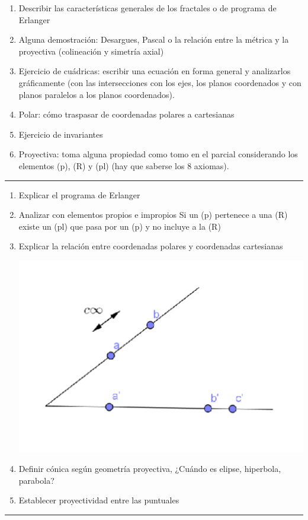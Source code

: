 \documentclass[9pt,a4paper]{extarticle}
\begin{document}
\begin{enumerate}
    \item Describir las características generales de los fractales o de programa de Erlanger
\item	Alguna demostración: Desargues, Pascal o la relación entre la métrica y la proyectiva (colineación y simetría axial)
\item	Ejercicio de cuádricas: escribir una ecuación en forma general y analizarlos gráficamente (con las intersecciones con los ejes, los planos coordenados y con planos paralelos a los planos coordenados).
\item	Polar: cómo traspasar de coordenadas polares a cartesianas
\item	Ejercicio de invariantes
\item	Proyectiva: toma alguna propiedad como tomo en el parcial considerando los elementos (p), (R) y (pl) (hay que saberse los 8 axiomas).
\end{enumerate}
\hrule

\begin{enumerate}
\item Explicar el programa de Erlanger 
\item Analizar con elementos propios e impropios 
Si un (p) pertenece a una (R) existe un (pl) que pasa por un (p) y no incluye a la (R)
\item Explicar la relación entre coordenadas polares y coordenadas cartesianas
   
\begin{center}
\includegraphics[scale=0.75]{141215final.png}    
\end{center}
\item Definir cónica según geometría proyectiva, ¿Cuándo es elipse, hiperbola, parabola?
\item Establecer proyectividad entre las puntuales
 \end{enumerate}
 \hrule
 \newpage
 
\end{document}
